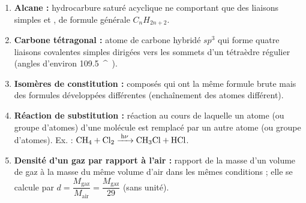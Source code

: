 \documentclass[11pt]{article}
\providecommand{\degree}{^{\circ}}
\begin{document}
\begin{corrige}
\begin{enumerate}
\item \textbf{Alcane :} hydrocarbure saturé acyclique ne comportant que des liaisons simples  et , de formule générale $C_nH_{2n+2}$.
\item \textbf{Carbone tétragonal :} atome de carbone hybridé $sp^3$ qui forme quatre liaisons covalentes simples dirigées vers les sommets d'un tétraèdre régulier (angles d'environ \SI{109,5}{\degree}).
\item \textbf{Isomères de constitution :} composés qui ont la même formule brute mais des formules développées différentes (enchaînement des atomes différent).
\item \textbf{Réaction de substitution :} réaction au cours de laquelle un atome (ou groupe d'atomes) d'une molécule est remplacé par un autre atome (ou groupe d'atomes). Ex. : $\ce{CH4 + Cl2 ->[h\nu] CH3Cl + HCl}$.
\item \textbf{Densité d'un gaz par rapport à l'air :} rapport de la masse d'un volume de gaz à la masse du même volume d'air dans les mêmes conditions ; elle se calcule par $d = \dfrac{M_{\text{gaz}}}{M_{\text{air}}} = \dfrac{M_{\text{gaz}}}{29}$ (sans unité).
\end{enumerate}
\end{corrige}
\end{document}
